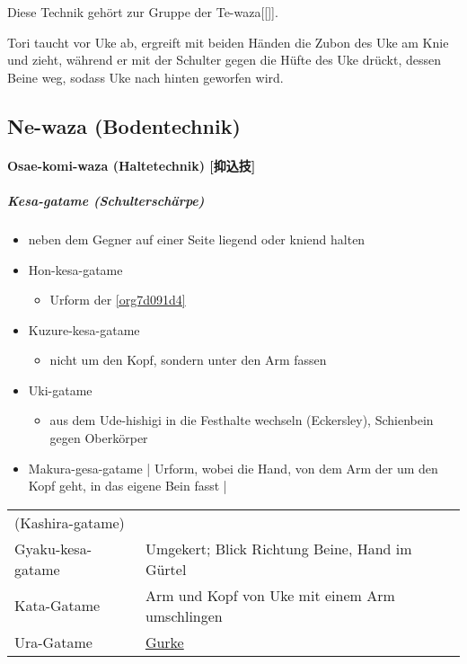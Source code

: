\documentclass[justified, a4paper, notitlepage, captions=tableheading, nobib]{tufte-handout}
\begin{document}
Diese Technik gehört zur Gruppe der Te-waza[[]].

Tori taucht vor Uke ab, ergreift mit beiden Händen die Zubon des Uke am Knie und zieht, während er mit der Schulter gegen die Hüfte des Uke drückt, dessen Beine weg, sodass Uke nach hinten geworfen wird.

\subsection{Ne-waza (Bodentechnik)}
\label{sec:orge9c5e0b}

\paragraph{Osae-komi-waza (Haltetechnik) [抑込技] }
\label{sec:orgde7304d}

\subparagraph{\label{org7d091d4}Kesa-gatame (Schulterschärpe)}
\label{sec:org8424011}
\begin{itemize}
\item neben dem Gegner auf einer Seite liegend oder kniend halten

\item \label{orge7fa092}Hon-kesa-gatame 
\begin{itemize}
\item Urform der \ref{org7d091d4}
\end{itemize}
\item \label{org2d61943}Kuzure-kesa-gatame 
\begin{itemize}
\item nicht um den Kopf, sondern unter den Arm fassen
\end{itemize}
\item \label{orgf277a9f}Uki-gatame         
\begin{itemize}
\item aus dem Ude-hishigi in die Festhalte wechseln (Eckersley), Schienbein gegen Oberkörper
\end{itemize}
\end{itemize}


\begin{itemize}
\item \label{org7d3fcf1}Makura-gesa-gatame | Urform, wobei die Hand, von dem Arm der um den Kopf geht, in das eigene Bein fasst     |
\end{itemize}
\begin{center}
\begin{tabular}{ll}
(Kashira-gatame) & \\
\label{org8d71ac4}Gyaku-kesa-gatame & Umgekert; Blick Richtung Beine, Hand im Gürtel\\
\label{org024b4c5}Kata-Gatame & Arm und Kopf von Uke mit einem Arm umschlingen\\
\label{org5e774e4}Ura-Gatame & \hyperref[orgf110735]{Gurke}\\
\end{tabular}
\end{center}
\end{document}
